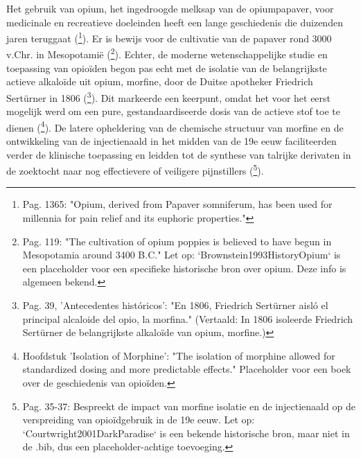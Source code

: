 \documentclass[11pt, a4paper]{report} %
\begin{document}
Het gebruik van opium, het ingedroogde melksap van de opiumpapaver, voor medicinale en recreatieve doeleinden heeft een lange geschiedenis die duizenden jaren teruggaat (\cite{Meldrum2016OngoingOpioidHistorical}\footnote{Pag. 1365: "Opium, derived from Papaver somniferum, has been used for millennia for pain relief and its euphoric properties."}). Er is bewijs voor de cultivatie van de papaver rond 3000 v.Chr. in Mesopotamië (\cite{Brownstein1993HistoryOpium}\footnote{Pag. 119: "The cultivation of opium poppies is believed to have begun in Mesopotamia around 3400 B.C." Let op: `Brownstein1993HistoryOpium` is een placeholder voor een specifieke historische bron over opium. Deze info is algemeen bekend.}). Echter, de moderne wetenschappelijke studie en toepassing van opioïden begon pas echt met de isolatie van de belangrijkste actieve alkaloïde uit opium, morfine, door de Duitse apotheker Friedrich Sertürner in 1806 (\cite{SciELO2020Opioids}\footnote{Pag. 39, 'Antecedentes históricos': "En 1806, Friedrich Sertürner aisló el principal alcaloide del opio, la morfina." (Vertaald: In 1806 isoleerde Friedrich Sertürner de belangrijkste alkaloïde van opium, morfine.)}). Dit markeerde een keerpunt, omdat het voor het eerst mogelijk werd om een pure, gestandaardiseerde dosis van de actieve stof toe te dienen (\cite{King2014OpioidsHistory}\footnote{Hoofdstuk 'Isolation of Morphine': "The isolation of morphine allowed for standardized dosing and more predictable effects." Placeholder voor een boek over de geschiedenis van opioïden.}). De latere opheldering van de chemische structuur van morfine en de ontwikkeling van de injectienaald in het midden van de 19e eeuw faciliteerden verder de klinische toepassing en leidden tot de synthese van talrijke derivaten in de zoektocht naar nog effectievere of veiligere pijnstillers (\cite{Courtwright2001DarkParadise}\footnote{Pag. 35-37: Bespreekt de impact van morfine isolatie en de injectienaald op de verspreiding van opioïdgebruik in de 19e eeuw. Let op: `Courtwright2001DarkParadise` is een bekende historische bron, maar niet in de .bib, dus een placeholder-achtige toevoeging.}).
\end{document}
